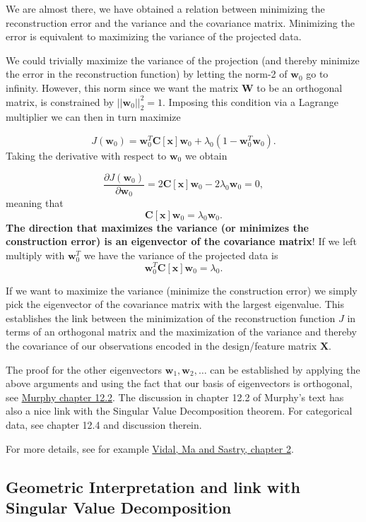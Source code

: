 \documentclass[%
oneside,                 %
final,                   %
10pt]{article}
\begin{document}
We are almost there, we have obtained a relation between minimizing
the reconstruction error and the variance and the covariance
matrix. Minimizing the error is equivalent to maximizing the variance
of the projected data.

We could trivially maximize the variance of the projection (and
thereby minimize the error in the reconstruction function) by letting
the norm-2 of $\bm{w}_0$ go to infinity. However, this norm since we
want the matrix $\bm{W}$ to be an orthogonal matrix, is constrained by
$\vert\vert \bm{w}_0 \vert\vert_2^2=1$. Imposing this condition via a
Lagrange multiplier we can then in turn maximize

\[
J(\bm{w}_0)= \bm{w}_0^T\bm{C}[\bm{x}]\bm{w}_0+\lambda_0(1-\bm{w}_0^T\bm{w}_0).
\]
Taking the derivative with respect to $\bm{w}_0$ we obtain

\[
\frac{\partial J(\bm{w}_0)}{\partial \bm{w}_0}= 2\bm{C}[\bm{x}]\bm{w}_0-2\lambda_0\bm{w}_0=0,
\]
meaning that
\[
\bm{C}[\bm{x}]\bm{w}_0=\lambda_0\bm{w}_0.
\]
\textbf{The direction that maximizes the variance (or minimizes the construction error) is an eigenvector of the covariance matrix}! If we left multiply with $\bm{w}_0^T$ we have the variance of the projected data is
\[
\bm{w}_0^T\bm{C}[\bm{x}]\bm{w}_0=\lambda_0.
\]

If we want to maximize the variance (minimize the construction error)
we simply pick the eigenvector of the covariance matrix with the
largest eigenvalue. This establishes the link between the minimization
of the reconstruction function $J$ in terms of an orthogonal matrix
and the maximization of the variance and thereby the covariance of our
observations encoded in the design/feature matrix $\bm{X}$.

The proof
for the other eigenvectors $\bm{w}_1,\bm{w}_2,\dots$ can be
established by applying the above arguments and using the fact that
our basis of eigenvectors is orthogonal, see \href{{https://mitpress.mit.edu/books/machine-learning-1}}{Murphy chapter
12.2}.  The
discussion in chapter 12.2 of Murphy's text has also a nice link with
the Singular Value Decomposition theorem. For categorical data, see
chapter 12.4 and discussion therein.

For more details, see for example \href{{https://www.springer.com/gp/book/9780387878102}}{Vidal, Ma and Sastry, chapter 2}.

\subsection{Geometric Interpretation and link with Singular Value Decomposition}
\end{document}
